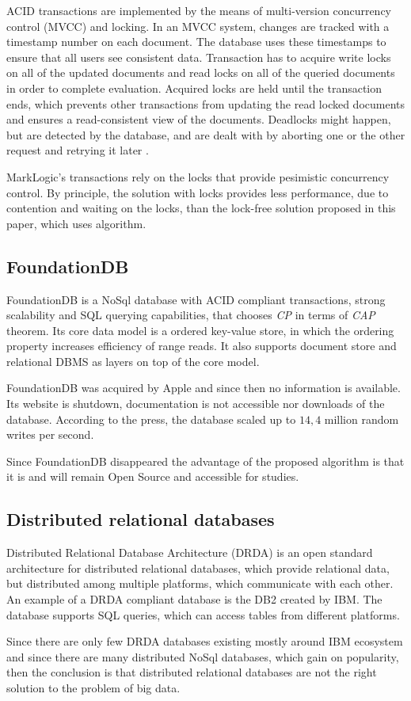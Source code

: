 ACID transactions are implemented by the means of multi-version concurrency control (MVCC) and locking. In an MVCC system, changes are tracked with a timestamp number on each document. 
The database uses these timestamps to ensure that all users see consistent data. 
Transaction has to acquire write locks on all of the updated documents and read locks on all of the queried documents in order to complete evaluation. Acquired locks are held until the transaction ends, which prevents other transactions from updating the read locked documents and ensures a read-consistent view of the documents. 
Deadlocks might happen, but are detected by the database, and are dealt with by aborting one or the other request and retrying it later \cite{markLogicUnderstandingTransactions}.

MarkLogic's transactions rely on the locks that provide pesimistic concurrency control.
By principle, the solution with locks provides less performance, due to contention and waiting on the locks, than the lock-free solution proposed in this paper, which uses \paxos algorithm.


\subsection{FoundationDB}
FoundationDB is a NoSql database with ACID compliant transactions, strong scalability and SQL querying capabilities, that chooses \emph{CP} in terms of \emph{CAP} theorem.
Its core data model is a ordered key-value store, in which the ordering property increases efficiency of range reads. It also supports document store and relational DBMS as layers on top of the core model. 

FoundationDB was acquired by Apple \cite{foundationDbAcquired} and since then no information is available. Its website is shutdown, documentation is not accessible nor downloads of the database. According to the press, the database scaled up to $14,4$ million random writes per second.

Since FoundationDB disappeared the advantage of the proposed algorithm is that it is and will remain Open Source and accessible for studies.

\subsection{Distributed relational databases}
Distributed Relational Database Architecture (DRDA) \cite{drda} is an open standard architecture for distributed relational databases, which provide relational data, but distributed among multiple platforms, which communicate with each other. An example of a DRDA compliant database is the DB2 created by IBM. The database supports SQL queries, which can access tables from different platforms. 

Since there are only few DRDA databases existing mostly around IBM ecosystem and since there are many distributed NoSql databases, which gain on popularity, then the conclusion is that distributed relational databases are not the right solution to the problem of big data.